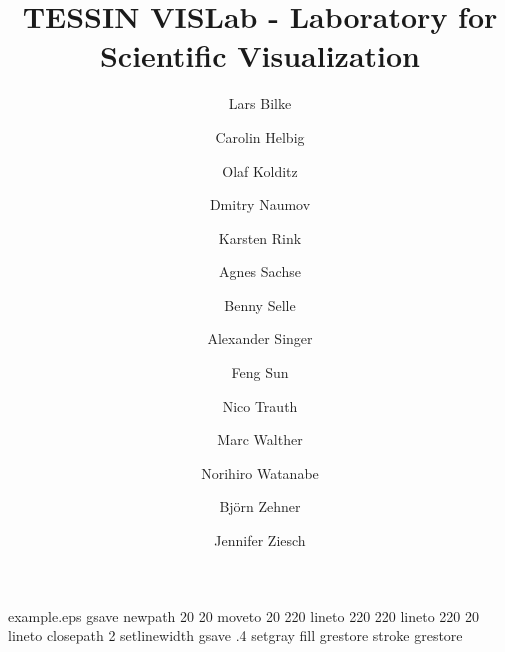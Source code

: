 %
%
%
%
%
\begin{filecontents*}{example.eps}
gsave
newpath
  20 20 moveto
  20 220 lineto
  220 220 lineto
  220 20 lineto
closepath
2 setlinewidth
gsave
  .4 setgray fill
grestore
stroke
grestore
\end{filecontents*}
%
\RequirePackage{fix-cm}
%
\documentclass[twocolumn]{svjour3}          %
%
\smartqed  %
%
\usepackage{graphicx}
%
%
\usepackage{url}

%
%
%


\title{TESSIN VISLab - Laboratory for Scientific Visualization%
}


\author{Lars Bilke         \and
        Carolin Helbig     \and
        Olaf Kolditz       \and
        Dmitry Naumov      \and
        Karsten Rink       \and
        Agnes Sachse       \and
        Benny Selle        \and
        Alexander Singer   \and
        Feng Sun           \and
        Nico Trauth        \and
        Marc Walther       \and
        Norihiro Watanabe  \and
        Bj\"orn Zehner     \and
        Jennifer Ziesch
}


